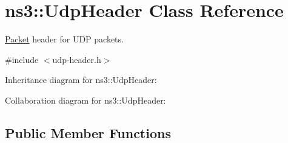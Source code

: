 \hypertarget{classns3_1_1UdpHeader}{}\section{ns3\+:\+:Udp\+Header Class Reference}
\label{classns3_1_1UdpHeader}


\hyperlink{classns3_1_1Packet}{Packet} header for U\+DP packets.  




{\ttfamily \#include $<$udp-\/header.\+h$>$}



Inheritance diagram for ns3\+:\+:Udp\+Header\+:


Collaboration diagram for ns3\+:\+:Udp\+Header\+:
\subsection*{Public Member Functions}
